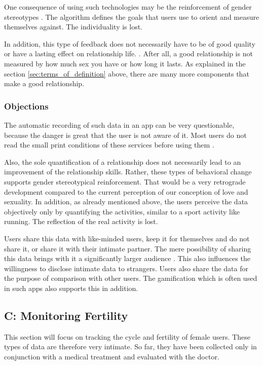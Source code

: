 One consequence of using such technologies may be the reinforcement of gender stereotypes \cite{doi:10.1080/13691058.2014.920528}. The algorithm defines the goals that users use to orient and measure themselves against. The individuality is lost.

In addition, this type of feedback does not necessarily have to be of good quality or have a lasting effect on relationship life. \cite{doi:10.1080/15265161.2017.1409823}. After all, a good relationship is not measured by how much sex you have or how long it lasts. As explained in the section \ref{sec:terms_of_definition} above, there are many more components that make a good relationship.

\subsubsection{Objections}
The automatic recording of such data in an app can be very questionable, because the danger is great that the user is not aware of it. Most users do not read the small print conditions of these services before using them \cite{levy2014intimate}.

Also, the sole quantification of a relationship does not necessarily lead to an improvement of the relationship skills. Rather, these types of behavioral change supports gender stereotypical reinforcement. That would be a very retrograde development compared to the current perception of our conception of love and sexuality. %
In addition, as already mentioned above, the users perceive the data objectively only by quantifying the activities, similar to a sport activity like running. The reflection of the real activity is lost.

Users share this data with like-minded users, keep it for themselves and do not share it, or share it with their intimate partner.
The mere possibility of sharing this data brings with it a significantly larger audience \cite{doi:10.1080/13691058.2014.920528}. This also influences the willingness to disclose intimate data to strangers.
Users also share the data for the purpose of comparison with other users. The gamification which is often used in such apps also supports this in addition.

\subsection{C: Monitoring Fertility}
This section will focus on tracking the cycle and fertility of female users. These types of data are therefore very intimate. So far, they have been collected only in conjunction with a medical treatment and evaluated with the doctor.

